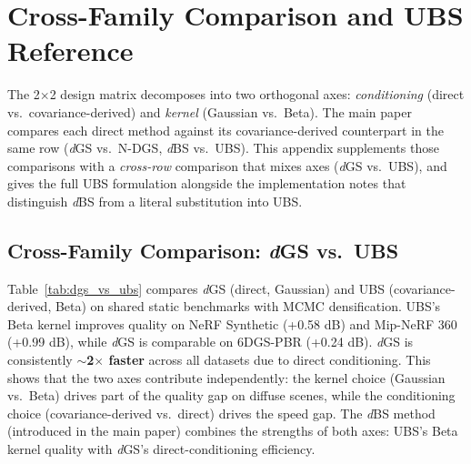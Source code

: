 \documentclass{article}
\newcommand{\dgs}{\textit{d}GS\xspace}
\newcommand{\dbs}{\textit{d}BS\xspace}
\theoremstyle{plain}
\theoremstyle{definition}
\theoremstyle{remark}
\begin{document}



\section{Cross-Family Comparison and UBS Reference}
\label{sec:dbs}

The 2$\times$2 design matrix decomposes into two orthogonal axes: \textit{conditioning} (direct vs.\ covariance-derived) and \textit{kernel} (Gaussian vs.\ Beta). The main paper compares each direct method against its covariance-derived counterpart in the same row (\dgs{} vs.\ N-DGS, \dbs{} vs.\ UBS). This appendix supplements those comparisons with a \textit{cross-row} comparison that mixes axes (\dgs{} vs.\ UBS), and gives the full UBS formulation alongside the implementation notes that distinguish \dbs{} from a literal substitution into UBS.

\subsection{Cross-Family Comparison: \dgs{} vs.\ UBS}

Table~\ref{tab:dgs_vs_ubs} compares \dgs{} (direct, Gaussian) and UBS (covariance-derived, Beta) on shared static benchmarks with MCMC densification. UBS's Beta kernel improves quality on NeRF Synthetic (+0.58 dB) and Mip-NeRF 360 (+0.99 dB), while \dgs{} is comparable on 6DGS-PBR (+0.24 dB). \dgs{} is consistently \textbf{$\sim$2$\times$ faster} across all datasets due to direct conditioning. This shows that the two axes contribute independently: the kernel choice (Gaussian vs.\ Beta) drives part of the quality gap on diffuse scenes, while the conditioning choice (covariance-derived vs.\ direct) drives the speed gap. The \dbs{} method (introduced in the main paper) combines the strengths of both axes: UBS's Beta kernel quality with \dgs{}'s direct-conditioning efficiency.
\end{document}
